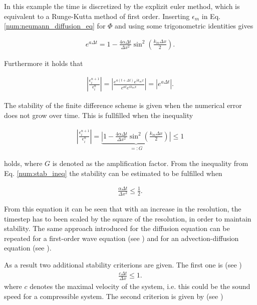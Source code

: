 In this example the time is discretized by the explizit euler method, which is equivalent to a Runge-Kutta method of first order.
Inserting $\epsilon_m$ in Eq. \ref{num:neumann_diffusion_eq} for $\Phi$ and using some trigonometric identities  gives

\begin{align}
    e^{a \Delta t} = 1 -  \frac{4\alpha \Delta t}{\Delta x^2} \sin^2\left(\frac{k_m \Delta x}{2}\right).
\end{align}

Furthermore it holds that

\begin{align}
    \left|\frac{\epsilon_i^{n+1}}{\epsilon_i^n}\right| =
    \left|\frac{e^{a(t + \Delta t)}e^{ik_mx}}{ e^{at}e^{ik_m x}}\right| = \left|e^{a\Delta t}\right|.
\end{align}

The stability of the finite difference scheme is given when the numerical error does not grow over time. This is fullfilled when the inequality

\begin{align}
    \label{num:stab_ineq}
    \left|\frac{\epsilon_i^{n+1}}{\epsilon_i^n}\right| =
    \underbrace{\left|1 -  \frac{4\alpha \Delta t}{\Delta x^2} \sin^2\left(\frac{k_m \Delta x}{2}\right)\right|}_{=:G} \leq 1
\end{align}

holds, where $G$ is denoted as the amplification factor. From the inequality from Eq. \ref{num:stab_ineq}
the stability can be estimated to be fulfilled when

\begin{align}
   \frac{\alpha \Delta t}{\Delta x^2} \leq \frac{1}{2}.
\end{align}

From this equation it can be seen that with an increase in the resolution, the timestep has to been scaled by the square of the resolution, in order to
maintain stability. The same approach introduced for the diffusion equation can be repeated for a first-order wave equation (see \citep{janderson})
and for an advection-diffusion equation (see \citep{ferziger99}).

As a result two additional stability criterions are given.
The first one is (see \citep{janderson})
\begin{align}
    \label{num:stab_soundspeed}
   \frac{c \Delta t}{\Delta x} \leq 1.
\end{align}
where $c$ denotes the maximal velocity of the system, i.e. this could be the sound speed for a compressible system.
The second criterion is given by (see \citep{ferziger99})

